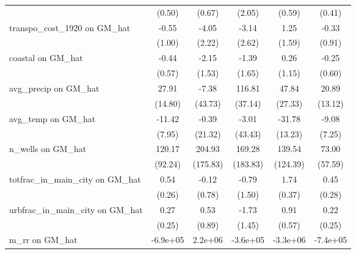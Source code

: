 \begin{table}[htbp]
\begin{tabular}{l*{5}{c}}
                &   (0.50)         &   (0.67)         &   (2.05)         &   (0.59)         &   (0.41)         \\
\addlinespace
transpo\_cost\_1920 on GM\_hat&    -0.55         &    -4.05         &    -3.14         &     1.25         &    -0.33         \\
                &   (1.00)         &   (2.22)         &   (2.62)         &   (1.59)         &   (0.91)         \\
\addlinespace
coastal on GM\_hat&    -0.44         &    -2.15         &    -1.39         &     0.26         &    -0.25         \\
                &   (0.57)         &   (1.53)         &   (1.65)         &   (1.15)         &   (0.60)         \\
\addlinespace
avg\_precip on GM\_hat&    27.91         &    -7.38         &   116.81\sym{**} &    47.84         &    20.89         \\
                &  (14.80)         &  (43.73)         &  (37.14)         &  (27.33)         &  (13.12)         \\
\addlinespace
avg\_temp on GM\_hat&   -11.42         &    -0.39         &    -3.01         &   -31.78\sym{*}  &    -9.08         \\
                &   (7.95)         &  (21.32)         &  (43.43)         &  (13.23)         &   (7.25)         \\
\addlinespace
n\_wells on GM\_hat&   120.17         &   204.93         &   169.28         &   139.54         &    73.00         \\
                &  (92.24)         & (175.83)         & (183.83)         & (124.39)         &  (57.59)         \\
\addlinespace
totfrac\_in\_main\_city on GM\_hat&     0.54\sym{*}  &    -0.12         &    -0.79         &     1.74\sym{***}&     0.45         \\
                &   (0.26)         &   (0.78)         &   (1.50)         &   (0.37)         &   (0.28)         \\
\addlinespace
urbfrac\_in\_main\_city on GM\_hat&     0.27         &     0.53         &    -1.73         &     0.91         &     0.22         \\
                &   (0.25)         &   (0.89)         &   (1.45)         &   (0.57)         &   (0.25)         \\
\addlinespace
m\_rr on GM\_hat  & -6.9e+05         &  2.2e+06         & -3.6e+05         & -3.3e+06         & -7.4e+05         \\

\end{tabular}
\end{table}
